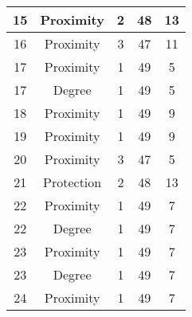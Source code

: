 \documentclass[results.tex]{subfiles}
\begin{document}
\begin{center}
\begin{tabular}{| c || c | c | c | c |}
            \hline
            15                      & Proximity                    & 2                      & 48                      & 13                   \\
            \hline
            16                      & Proximity                    & 3                      & 47                      & 11                   \\
            \hline
            17                      & Proximity                    & 1                      & 49                      & 5                    \\
            \hline
            17                      & Degree                       & 1                      & 49                      & 5                    \\
            \hline
            18                      & Proximity                    & 1                      & 49                      & 9                    \\
            \hline
            19                      & Proximity                    & 1                      & 49                      & 9                    \\
            \hline
            20                      & Proximity                    & 3                      & 47                      & 5                    \\
            \hline
            21                      & Protection                   & 2                      & 48                      & 13                   \\
            \hline
            22                      & Proximity                    & 1                      & 49                      & 7                    \\
            \hline
            22                      & Degree                       & 1                      & 49                      & 7                    \\
            \hline
            23                      & Proximity                    & 1                      & 49                      & 7                    \\
            \hline
            23                      & Degree                       & 1                      & 49                      & 7                    \\
            \hline
            24                      & Proximity                    & 1                      & 49                      & 7                    \\

\end{tabular}
\end{center}
\end{document}
